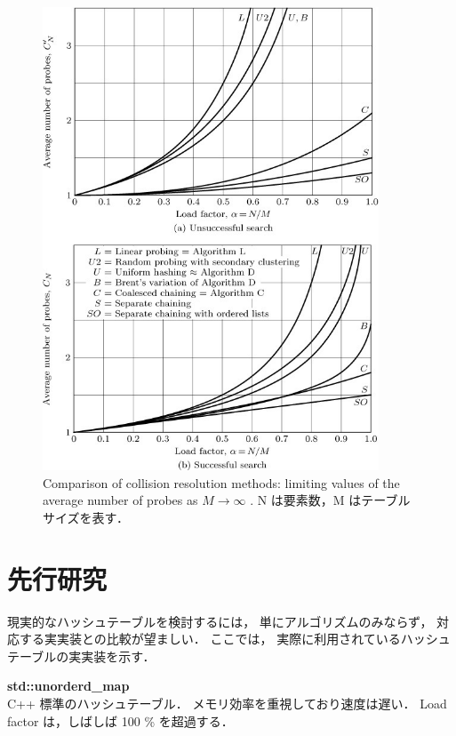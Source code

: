\begin{figure} %
  \centering
  \includegraphics[width=10cm]{./figs/taocp_v3_fig44.png}
  \caption{
    Comparison of collision resolution methods: limiting values of the average number of probes as $M \rightarrow \infty$ \citep{knuth1998}.
    N は要素数，M はテーブルサイズを表す．
  }
  \label{fig_taocp_v3_fig44}
\end{figure}


\section{先行研究}
現実的なハッシュテーブルを検討するには，
単にアルゴリズムのみならず，
対応する実実装との比較が望ましい．
ここでは，
実際に利用されているハッシュテーブルの実実装を示す．
\leavevmode \newline

{\bf std::unorderd\_map}
\samepage \\ \indent
C++ 標準のハッシュテーブル．
メモリ効率を重視しており速度は遅い．
Load factor は，しばしば 100 \% を超過する．


